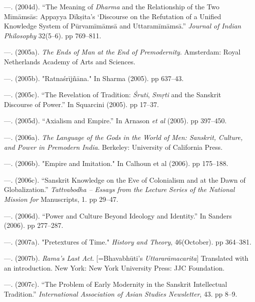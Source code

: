 \begin{thebibliography}{99}
 \item —. (2004d). “The Meaning of \textit{Dharma} and the Relationship of the Two Mīmāmsās: Appayya Dīkṣita’s ‘Discourse on the Refutation of a Unified Knowledge System of Pūrvamīmāmsā and Uttaramīmāmsā.” \textit{Journal of Indian Philosophy} 32(5–6). pp 769–811.

 \item —. (2005a).\textit{ The Ends of Man at the End of Premodernity}. Amsterdam: Royal Netherlands Academy of Arts and Sciences.

 \item —. (2005b). "Ratnaśrījñāna." In Sharma (2005). pp 637–43.

 \item —. (2005c). “The Revelation of Tradition: \textit{Śruti}, \textit{Smṛti} and the Sanskrit Discourse of Power.” In Squarcini (2005). pp 17–37.

 \item —. (2005d). “Axialism and Empire.” In Arnason \textit{et al} (2005). pp 397–450.

 \item —. (2006a).\textit{ The Language of the Gods in the World of Men: Sanskrit, Culture, and Power in Premodern India}. Berkeley: University of California Press.

 \item —. (2006b). "Empire and Imitation." In Calhoun et al (2006). pp 175–188.

 \item —. (2006c). “Sanskrit Knowledge on the Eve of Colonialism and at the Dawn of Globalization.” \textit{Tattvabodha – Essays from the Lecture Series of the National Mission for }Manuscripts, 1. pp 29–47.

 \item —. (2006d). “Power and Culture Beyond Ideology and Identity.” In Sanders (2006). pp 277–287.

 \item —. (2007a). "Pretextures of Time." \textit{History and Theory}, 46(October). pp 364–381.

 \item —. (2007b).\textit{ Rama’s Last Act}. [=Bhavabhūti’s \textit{Uttararāmacarita}] Translated with an introduction. New York: New York University Press: JJC Foundation.

 \item —. (2007c). “The Problem of Early Modernity in the Sanskrit Intellectual Tradition.” \textit{International Association of Asian Studies Newsletter}, 43. pp 8–9.


\end{thebibliography}
